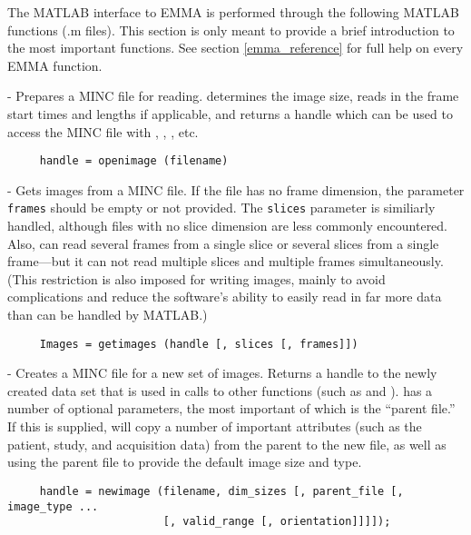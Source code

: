 The MATLAB interface to EMMA is performed through the following MATLAB
functions (.m files).  This section is only meant to provide a brief
introduction to the most important functions.  See section
\ref{emma_reference} for full help on every EMMA function.

\begin{description}

\item {} - Prepares a MINC file for reading.
 determines the image size, reads in the frame start
times and lengths if applicable, and returns a handle which can be
used to access the MINC file with ,
, , etc.
\begin{verbatim}
     handle = openimage (filename)
\end{verbatim}

\item {} - Gets images from a MINC file.  If the
file has no frame dimension, the parameter \verb|frames| should be
empty or not provided.  The \verb|slices| parameter is similiarly
handled, although files with no slice dimension are less commonly
encountered.  Also,  can read several frames from a
single slice or several slices from a single frame---but it can not
read multiple slices and multiple frames simultaneously.  (This
restriction is also imposed for writing images, mainly to avoid
complications and reduce the software's ability to easily read in far
more data than can be handled by MATLAB.)
\begin{verbatim}
     Images = getimages (handle [, slices [, frames]])
\end{verbatim}

\item {} - Creates a MINC file for a new set of images.
Returns a handle to the newly created data set that is used in calls
to other functions (such as  and ).
 has a number of optional parameters, the most
important of which is the ``parent file.''  If this is supplied,
 will copy a number of important attributes (such as
the patient, study, and acquisition data) from the parent to the new
file, as well as using the parent file to provide the default image
size and type.
\begin{verbatim}
     handle = newimage (filename, dim_sizes [, parent_file [, image_type ...
                        [, valid_range [, orientation]]]]);
\end{verbatim}


\end{description}

